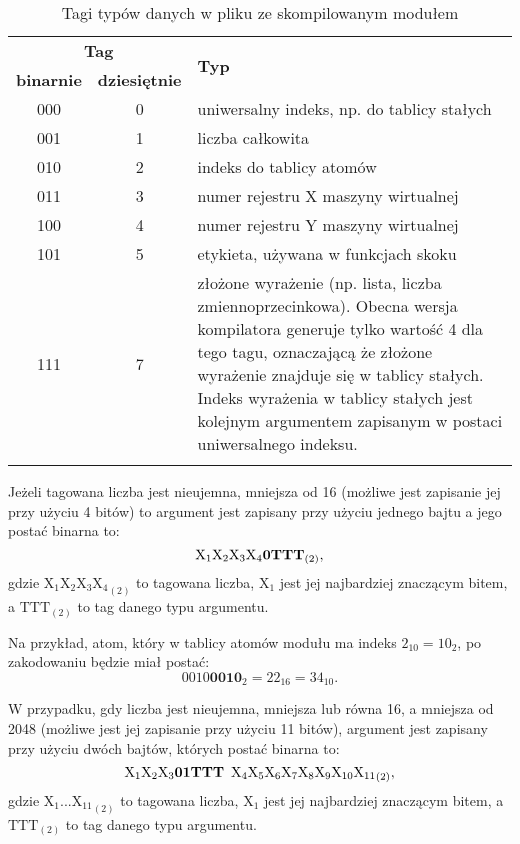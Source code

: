 \begin{longtable}{|c|c|p{9cm}|}
\hline

\multicolumn{2}{|c|}{\textbf{Tag}} & \multirow{2}{*}{\textbf{Typ}} \\
\cline{1-2}
\textbf{binarnie} & \textbf{dziesiętnie} & \\
\hline
\endfirsthead

000 & 0 & uniwersalny indeks, np. do tablicy stałych \\
\hline
001 & 1 & liczba całkowita \\ 
\hline
010 & 2 & indeks do tablicy atomów \\
\hline
011 & 3 & numer rejestru X maszyny wirtualnej \\
\hline
100 & 4 & numer rejestru Y maszyny wirtualnej \\
\hline
101 & 5 & etykieta, używana w funkcjach skoku \\
\hline
111 & 7 & złożone wyrażenie (np. lista, liczba zmiennoprzecinkowa). Obecna wersja kompilatora generuje tylko wartość 4 dla tego tagu, oznaczającą że złożone wyrażenie znajduje się w tablicy stałych. Indeks wyrażenia w tablicy stałych jest kolejnym argumentem zapisanym w postaci uniwersalnego indeksu. \\
\hline

\caption{Tagi typów danych w pliku ze skompilowanym modułem} 
\label{table:codeTags} \\
\end{longtable}

Jeżeli tagowana liczba jest nieujemna, mniejsza od 16 (możliwe jest zapisanie jej przy użyciu 4 bitów) to argument jest zapisany przy użyciu jednego bajtu a jego postać binarna to:
$$ \text{X}_1\text{X}_2\text{X}_3\text{X}_4\mathbf{0}\text{\textbf{TTT}}_{(2)}, $$
gdzie ${\text{X}_1\text{X}_2\text{X}_3\text{X}_4}_{(2)}$ to tagowana liczba, $\text{X}_1$ jest jej najbardziej znaczącym bitem, a $\text{TTT}_{(2)}$ to tag danego typu argumentu.

Na przykład, atom, który w tablicy atomów modułu ma indeks $2_{10} = 10_{2}$, po zakodowaniu będzie miał postać:
$$0010\mathbf{0010}_{2} = 22_{16} = 34_{10}.$$

W przypadku, gdy liczba jest nieujemna, mniejsza lub równa 16, a mniejsza od 2048 (możliwe jest jej zapisanie przy użyciu 11 bitów), argument jest zapisany przy użyciu dwóch bajtów, których postać binarna to:
$$  {\text{X}_1\text{X}_2\text{X}_3\mathbf{01}\text{\textbf{TTT}} \enskip \text{X}_4\text{X}_5\text{X}_6\text{X}_7\text{X}_8\text{X}_9\text{X}_{10}\text{X}_{11}}_{(2)}, $$
gdzie ${\text{X}_1 ... \text{X}_{11}}_{(2)}$ to tagowana liczba, $\text{X}_1$ jest jej najbardziej znaczącym bitem, a ${\text{TTT}}_{(2)}$ to tag danego typu argumentu.

